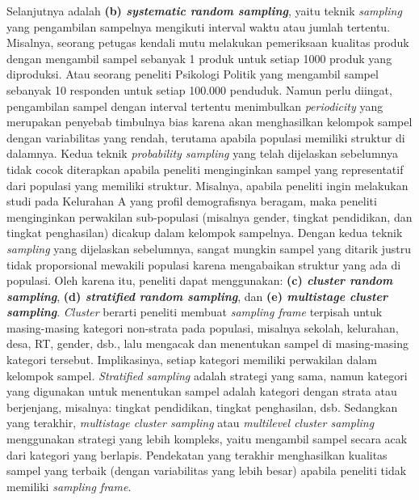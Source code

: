 \documentclass[
  english,
  man]{apa6}
\begin{document}
Selanjutnya adalah \textbf{(b) \emph{systematic random sampling}}, yaitu teknik \emph{sampling} yang pengambilan sampelnya mengikuti interval waktu atau jumlah tertentu. Misalnya, seorang petugas kendali mutu melakukan pemeriksaan kualitas produk dengan mengambil sampel sebanyak 1 produk untuk setiap 1000 produk yang diproduksi. Atau seorang peneliti Psikologi Politik yang mengambil sampel sebanyak 10 responden untuk setiap 100.000 penduduk. Namun perlu diingat, pengambilan sampel dengan interval tertentu menimbulkan \emph{periodicity} yang merupakan penyebab timbulnya bias karena akan menghasilkan kelompok sampel dengan variabilitas yang rendah, terutama apabila populasi memiliki struktur di dalamnya.
Kedua teknik \emph{probability sampling} yang telah dijelaskan sebelumnya tidak cocok diterapkan apabila peneliti menginginkan sampel yang representatif dari populasi yang memiliki struktur. Misalnya, apabila peneliti ingin melakukan studi pada Kelurahan A yang profil demografisnya beragam, maka peneliti menginginkan perwakilan sub-populasi (misalnya gender, tingkat pendidikan, dan tingkat penghasilan) dicakup dalam kelompok sampelnya. Dengan kedua teknik \emph{sampling} yang dijelaskan sebelumnya, sangat mungkin sampel yang ditarik justru tidak proporsional mewakili populasi karena mengabaikan struktur yang ada di populasi. Oleh karena itu, peneliti dapat menggunakan: \textbf{(c) \emph{cluster random sampling}}, \textbf{(d) \emph{stratified random sampling}}, dan \textbf{(e) \emph{multistage cluster sampling}}. \emph{Cluster} berarti peneliti membuat \emph{sampling frame} terpisah untuk masing-masing kategori non-strata pada populasi, misalnya sekolah, kelurahan, desa, RT, gender, dsb., lalu mengacak dan menentukan sampel di masing-masing kategori tersebut. Implikasinya, setiap kategori memiliki perwakilan dalam kelompok sampel. \emph{Stratified sampling} adalah strategi yang sama, namun kategori yang digunakan untuk menentukan sampel adalah kategori dengan strata atau berjenjang, misalnya: tingkat pendidikan, tingkat penghasilan, dsb. Sedangkan yang terakhir, \emph{multistage cluster sampling} atau \emph{multilevel cluster sampling} menggunakan strategi yang lebih kompleks, yaitu mengambil sampel secara acak dari kategori yang berlapis. Pendekatan yang terakhir menghasilkan kualitas sampel yang terbaik (dengan variabilitas yang lebih besar) apabila peneliti tidak memiliki \emph{sampling frame}.
\end{document}
